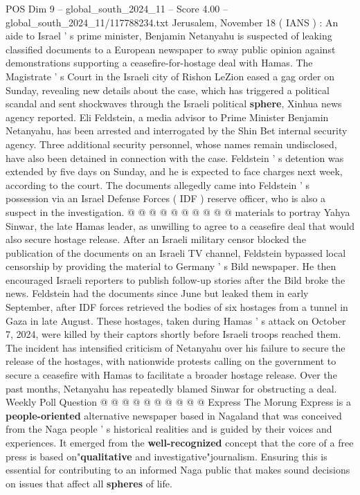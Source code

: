 \begin{textsample}{POS Dim 9 – global\_south\_2024\_11 – Score 4.00 – global\_south\_2024\_11/117788234.txt}  \label{ex:f9_pos_144}
Jerusalem, November 18 ( IANS ) : An aide to Israel ' s prime minister, Benjamin Netanyahu is suspected of leaking classified documents to a European newspaper to sway public opinion against demonstrations supporting a ceasefire-for-hostage deal with Hamas.
The Magistrate ' s Court in the Israeli city of Rishon LeZion eased a gag order on Sunday, revealing new details about the case, which has triggered a political scandal and sent shockwaves through the Israeli political \textbf{sphere}, Xinhua news agency reported.
Eli Feldstein, a media advisor to Prime Minister Benjamin Netanyahu, has been arrested and interrogated by the Shin Bet internal security agency.
Three additional security personnel, whose names remain undisclosed, have also been detained in connection with the case.
Feldstein ' s detention was extended by five days on Sunday, and he is expected to face charges next week, according to the court.
The documents allegedly came into Feldstein ' s possession via an Israel Defense Forces ( IDF ) reserve officer, who is also a suspect in the investigation. @ @ @ @ @ @ @ @ @ @ materials to portray Yahya Sinwar, the late Hamas leader, as unwilling to agree to a ceasefire deal that would also secure hostage release.
After an Israeli military censor blocked the publication of the documents on an Israeli TV channel, Feldstein bypassed local censorship by providing the material to Germany ' s Bild newspaper.
He then encouraged Israeli reporters to publish follow-up stories after the Bild broke the news.
Feldstein had the documents since June but leaked them in early September, after IDF forces retrieved the bodies of six hostages from a tunnel in Gaza in late August.
These hostages, taken during Hamas ' s attack on October 7, 2024, were killed by their captors shortly before Israeli troops reached them.
The incident has intensified criticism of Netanyahu over his failure to secure the release of the hostages, with nationwide protests calling on the government to secure a ceasefire with Hamas to facilitate a broader hostage release.
Over the past months, Netanyahu has repeatedly blamed Sinwar for obstructing a deal.
Weekly Poll Question @ @ @ @ @ @ @ @ @ @ Express The Morung Express is a \textbf{people-oriented} alternative newspaper based in Nagaland that was conceived from the Naga people ' s historical realities and is guided by their voices and experiences.
It emerged from the \textbf{well-recognized} concept that the core of a free press is based on"\textbf{qualitative} and investigative"journalism.
Ensuring this is essential for contributing to an informed Naga public that makes sound decisions on issues that affect all \textbf{spheres} of life.

\end{textsample}
